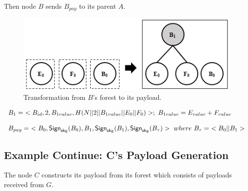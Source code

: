 \documentclass[%
  slidesonly,%
  semlayer%
  ]{seminar}                                  %
\newcommand{\sk}{\sf{sk}}
\begin{document}
\begin{slide}
      Then node $B$ sends $B_{pay}$ to its parent $A$.
      \begin{figure}[h!]
        \centering
        \includegraphics[scale = 0.5]{images/b-forest-payload.png}
        \caption{Transformation from $B$'s forest to its payload.}
        \label{fig:b-forest-payload}
      \end{figure}
      
      
      \begin{equation*}
        \begin{array}{l}
          B_{1} =\ < B_{id}, 2, B_{1value}, H(N||2||B_{1value}||E_{0}||F_{0})>;\ B_{1value} = E_{value} + F_{value}\\
          \\
          B_{pay} =\ < B_{0}, \textsf{Sign}_{\sk_{B}}(B_{0}), B_{1}, \textsf{Sign}_{\sk_{B}}(B_{1}), \textsf{Sign}_{\sk_{B}}(B_{\tau}) >\ where\ B_{\tau} =\ <B_{0} || B_{1}>\\
        \end{array}
        \label{eq:b-payload}
      \end{equation*}


      \vfill
      \clearpage
    
    \subsection*{Example Continue: C's Payload Generation}  
      The node $C$ constructs its payload from its forest which consists of payloads received from $G$.


\end{slide}
\end{document}
